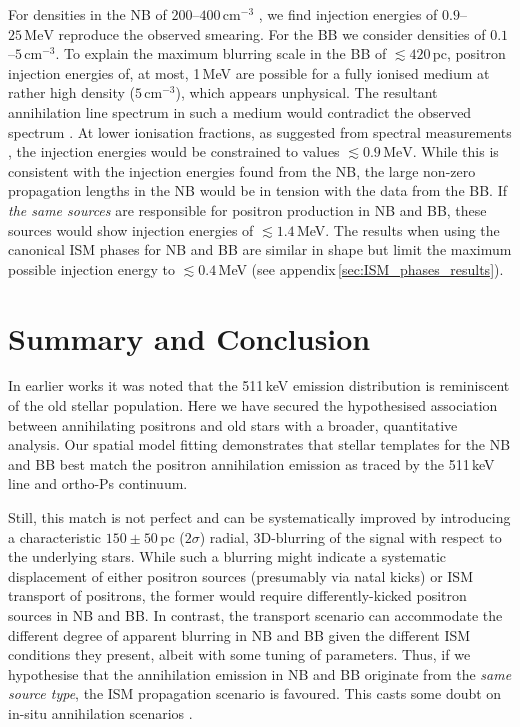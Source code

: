 \documentclass[doublespace,draft,nopageskip]{VTthesis} %
\begin{document}
	
	For densities in the NB of $200$--$400\,\mathrm{cm^{-3}}$ \citep{Launhardt2002_NB}, we find injection energies of $0.9$--$25\,\mathrm{MeV}$ reproduce the observed smearing.
	For the BB we consider densities of $0.1$--$5\,\mathrm{cm^{-3}}$.
	To explain the maximum blurring scale in the BB of $\lesssim 420\,\mathrm{pc}$, positron injection energies of, at most, 1\,MeV are possible for a fully ionised medium at rather high density ($5\,\mathrm{cm^{-3}}$), which appears unphysical.
	The resultant annihilation line spectrum in such a medium would contradict the observed spectrum \citep{Guessoum2005_511,Siegert2019_lv511}.
	At lower ionisation fractions, as suggested from spectral measurements \citep{Jean2006_511,Churazov2005_511}, the injection energies would be constrained to values $\lesssim 0.9\,\mathrm{MeV}$.
	While this is consistent with the injection energies found from the NB, the large non-zero propagation lengths in the NB would be in tension with the data from the BB.
	If \textit{the same sources} are responsible for positron production in NB and BB, these sources would show injection energies of $\lesssim 1.4$\,MeV.
	The results when using the canonical ISM phases for NB and BB are similar in shape but limit the maximum possible injection energy to $\lesssim 0.4$\,MeV (see appendix\,\ref{sec:ISM_phases_results}). 
	
	
	
	\section{Summary and Conclusion}\label{sec:summary}
	In earlier works \citep[e.g.,][]{Knoedlseder2005_511,Bouchet2011_diffuseCR} it was noted that the 511\,keV emission distribution is reminiscent of the old stellar population.
	Here we have  secured the hypothesised 
	association between annihilating
	positrons and old stars with a broader, quantitative analysis.
	Our spatial model fitting demonstrates that stellar templates for the NB and BB best match the positron annihilation emission as traced by the 511\,keV line and ortho-Ps continuum.
	
	Still, this match is not perfect and can be systematically improved by introducing a characteristic $150 \pm 50$\,pc ($2\sigma$)
	radial, 3D-blurring of the signal with respect to the underlying stars.
	While such a blurring might indicate a systematic displacement of either positron sources (presumably via natal kicks) or ISM transport of positrons, the former would require differently-kicked positron sources in NB and BB.
	In contrast, the transport scenario can accommodate the different degree of apparent blurring in NB and BB given the different ISM conditions they present, albeit with some tuning of parameters.
	Thus, if we hypothesise that the annihilation emission in NB and BB originate from the \textit{same source type}, the ISM propagation scenario is favoured.
	This casts some doubt on in-situ annihilation scenarios \citep[e.g.,][]{Bisnovatyi-Kogan2017_511}.
	
\end{document}
